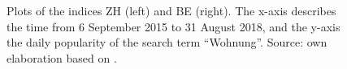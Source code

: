 \documentclass[11pt]{article}
\begin{document}
\begin{figure}[p!]
	\begin{minipage}{.5\linewidth}
		\centering
	\end{minipage}	\begin{minipage}{.5\linewidth}
		\centering
	\end{minipage}
	\caption{Plots of the indices ZH (left) and BE (right). The x-axis describes the time from 6 September 2015 to 31 August 2018, and the y-axis the daily popularity of the search term ``Wohnung''. Source: own elaboration based on \cite{googleT}.}
	\label{fig:orig}
\end{figure}
\end{document}

